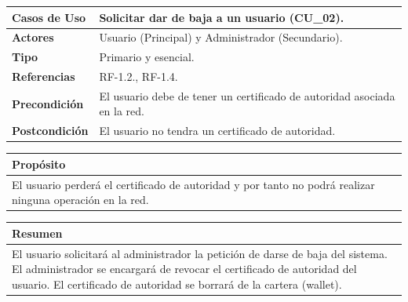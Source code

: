 \begin{itemize}
    \begin{table}[h!]
        \centering
        \begin{tabular}{|l|p{}|}
            \hline
            \textbf{Casos de Uso}   &   Solicitar dar de baja a un usuario (CU\_02). \\
            \hline 
            \textbf{Actores}        &   Usuario (Principal) y Administrador (Secundario). \\ 
            \hline 
            \textbf{Tipo}           &   Primario y esencial. \\
            \hline
            \textbf{Referencias}    &   RF-1.2., RF-1.4.\\ 
            \hline
            \textbf{Precondición}   &   El usuario debe de tener un certificado de autoridad asociada en la red.\\ 
            \hline
            \textbf{Postcondición}  &   El usuario no tendra un certificado de autoridad.\\ 
            \hline
        \end{tabular}
        
        \vspace{5mm}
        
        \begin{tabular}{|p{\textwidth}|}
            \hline
            \rowcolor{SeaGreen} \textbf{Propósito} \\
            \hline
            \multicolumn{1}{|p{12cm}|}{El usuario perderá el certificado de autoridad y por tanto no podrá realizar
            ninguna operación en la red.} \\ [0.5ex]
            \hline
        \end{tabular}
        
        \vspace{5mm}
        
        \begin{tabular}{|p{\textwidth}|}
            \hline
            \rowcolor{SeaGreen} \textbf{Resumen} \\
            \hline
            \multicolumn{1}{|p{12cm}|}{El usuario solicitará al administrador la petición de darse de baja del sistema. El 
            administrador se encargará de revocar el certificado de autoridad del usuario. El certificado de autoridad se 
            borrará de la cartera (wallet).} \\ [0.5ex]
            \hline
        \end{tabular}
        

\end{table}
\end{itemize}
